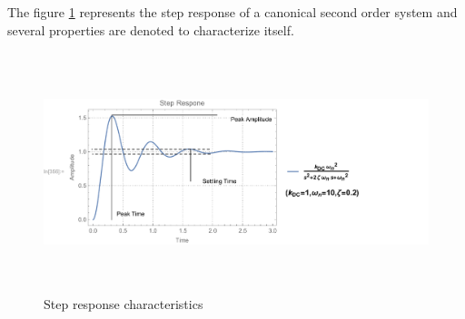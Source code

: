 \documentclass[12pt,english]{article}
\begin{document}
The figure \ref{second_order_underdamped_response} represents the step response of a canonical second order system and several properties are denoted to characterize itself.
\begin{figure}[htb!]
	\centering
	\includegraphics[height=7cm]{figures/step_response_of_2nd_order_system_1}
	\caption{Step response characteristics}
	\label{second_order_underdamped_response}
\end{figure}
\end{document}
